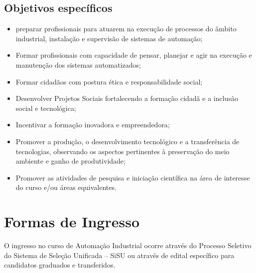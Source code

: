 \section{Objetivos específicos}

\begin{itemize}

\item preparar profissionais para atuarem na execução de processos do âmbito industrial, instalação e supervisão de sistemas de automação;

\item Formar profissionais com capacidade de pensar, planejar e agir na execução e manutenção dos sistemas automatizados;

\item Formar cidadãos com postura ética e responsabilidade social;




\item  Desenvolver Projetos Sociais fortalecendo a formação cidadã e a inclusão social e tecnológica;

\item Incentivar a formação inovadora e empreendedora;

\item Promover a produção, o desenvolvimento tecnológico e a transferência de tecnologias, observando os aspectos pertinentes à preservação do meio ambiente e ganho de produtividade;

\item Promover as atividades de pesquisa e iniciação científica na área de interesse do curso e/ou áreas equivalentes.

\end{itemize}

\chapter{Formas de Ingresso}

O ingresso no curso de Automação Industrial ocorre através do Processo Seletivo do Sistema de Seleção Unificada – SiSU ou através de edital específico para candidatos graduados e transferidos.

